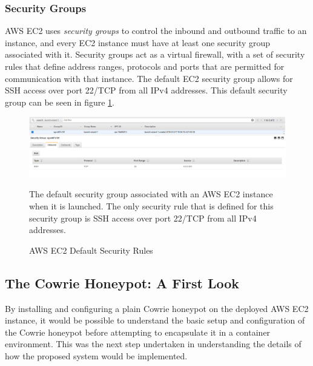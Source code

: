 \subsubsection{Security Groups \label{AWSSecurityGroupsExploration}}
AWS EC2 uses \textit{security groups} to control the inbound and outbound traffic to an instance, and every EC2 instance must have at least one security group associated with it. Security groups act as a virtual firewall, with a set of security rules that define address ranges, protocols and ports that are permitted for communication with that instance. The default EC2 security group allows for SSH access over port 22/TCP from all IPv4 addresses. This default security group can be seen in figure \ref{fig:DefaultEC2SecurityRules}.

\begin{figure}[ht]
      \centering
      \includegraphics[width=160mm, scale=1]{Images/AWS_default_security_group_rules.PNG}
      \caption{AWS EC2 Default Security Rules} 
      \medskip
	  \small
		The default security group associated with an AWS EC2 instance when it is launched. The only security rule that is defined for this security group is SSH access over port 22/TCP from all IPv4 addresses.
\label{fig:DefaultEC2SecurityRules}
\end{figure}



\subsection{The Cowrie Honeypot: A First Look}
By installing and configuring a plain Cowrie honeypot on the deployed AWS EC2 instance, it would be possible to understand the basic setup and configuration of the Cowrie honeypot before attempting to encapsulate it in a container environment. This was the next step undertaken in understanding the details of how the proposed system would be implemented.

